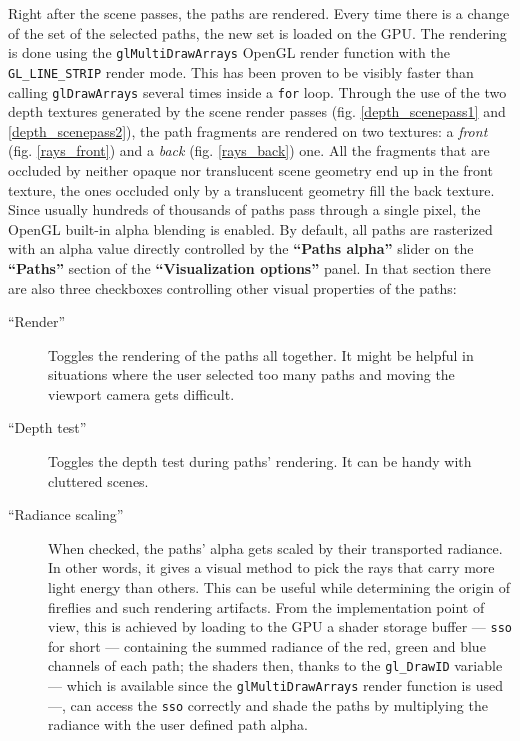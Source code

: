Right after the scene passes, the paths are rendered. Every time there is a change of the set of the selected paths, the new set is loaded on the GPU. The rendering is done using the \texttt{glMultiDrawArrays} OpenGL render function with the \texttt{GL\_LINE\_STRIP} render mode. This has been proven to be visibly faster than calling \texttt{glDrawArrays} several times inside a \texttt{for} loop. Through the use of the two depth textures generated by the scene render passes (fig. \ref{depth_scenepass1} and \ref{depth_scenepass2}), the path fragments are rendered on two textures: a \textit{front} (fig. \ref{rays_front}) and a \textit{back} (fig. \ref{rays_back}) one. All the fragments that are occluded by neither opaque nor translucent scene geometry end up in the front texture, the ones occluded only by a translucent geometry fill the back texture. Since usually hundreds of thousands of paths pass through a single pixel, the OpenGL built-in alpha blending is enabled. By default, all paths are rasterized with an alpha value directly controlled by the \textbf{“Paths alpha”} slider on the \textbf{“Paths”} section of the \textbf{“Visualization options”} panel. In that section there are also three checkboxes controlling other visual properties of the paths:
\begin{description}
	\item[“Render”] Toggles the rendering of the paths all together. It might be helpful in situations where the user selected too many paths and moving the viewport camera gets difficult.
	\item[“Depth test”] Toggles the depth test during paths' rendering. It can be handy with cluttered scenes.
	\item[“Radiance scaling”] When checked, the paths' alpha gets scaled by their transported radiance. In other words, it gives a visual method to pick the rays that carry more light energy than others. This can be useful while determining the origin of fireflies and such rendering artifacts. From the implementation point of view, this is achieved by loading to the GPU a shader storage buffer --- \texttt{sso} for short --- containing the summed radiance of the red, green and blue channels of each path; the shaders then, thanks to the \texttt{gl\_DrawID} variable --- which is available since the \texttt{glMultiDrawArrays} render function is used ---, can access the \texttt{sso} correctly and shade the paths by multiplying the radiance with the user defined path alpha.
\end{description}

